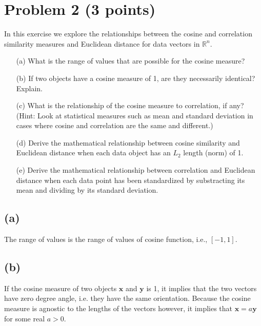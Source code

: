 \documentclass[10pt]{article}
\begin{document}
\color{red}
\section*{Problem 2 (3 points)}
In this exercise we explore the relationships between the cosine and correlation similarity measures and Euclidean distance for data vectors in $\mathbb{R}^n$.

\begin{itemize}
\item[(a)] What is the range of values that are possible for the cosine measure?
\item[(b)] If two objects have a cosine measure of 1, are they necessarily identical? Explain.
\item[(c)] What is the relationship of the cosine measure to correlation, if any? (Hint: Look at statistical measures such as mean and standard deviation in cases where cosine and correlation are the same and different.)
\item[(d)] Derive the mathematical relationship between cosine similarity and Euclidean distance when each data object has an $L_2$ length (norm) of 1.
\item[(e)] Derive the mathematical relationship between correlation and Euclidean distance when each data point has been standardized by substracting its mean and dividing by its standard deviation.
\end{itemize}

\color{black}
\subsection*{(a)}
The range of values is the range of values of cosine function, i.e., $[-1, 1]$.

\subsection*{(b)}
If the cosine measure of two objects $\textbf{x}$ and $\textbf{y}$ is 1, it implies that the two vectors have zero degree angle, i.e. they have the same orientation. Because the cosine measure is agnostic to the lengths of the vectors however, it implies that $\textbf{x} = a\textbf{y}$ for some real $a > 0$.
\end{document}
